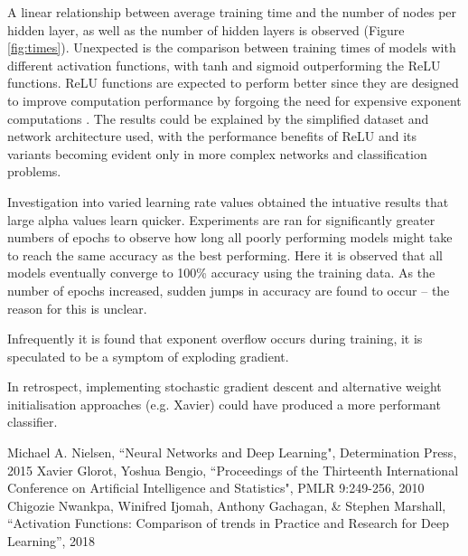\documentclass[12pt]{article}
\begin{document}
A linear relationship between average training time and the number of nodes per hidden layer, as well as the number of hidden layers is observed (Figure \ref{fig:times}). Unexpected is the comparison between training times of models with different activation functions, with tanh and sigmoid outperforming the ReLU functions. ReLU functions are expected to perform better since they are designed to improve computation performance by forgoing the need for expensive exponent computations \cite{Niwa}. The results could be explained by the simplified dataset and network architecture used, with the performance benefits of ReLU and its variants becoming evident only in more complex networks and classification problems.

Investigation into varied learning rate values obtained the intuative results that large alpha values learn quicker. Experiments are ran for significantly
greater numbers of epochs to observe how long all poorly performing models might take to reach the same accuracy as the best performing. Here it is observed that all models eventually converge to 100\% accuracy using the training data. As the number of epochs increased, sudden jumps in accuracy are found to occur -- the reason for this is unclear.

Infrequently it is found that exponent overflow occurs during training,
it is speculated to be a symptom of exploding gradient.

In retrospect, implementing stochastic gradient descent and alternative
weight initialisation approaches (e.g. Xavier) could have produced a
more performant classifier.

\vspace{-1.5em}
\begin{thebibliography}{10}
 Michael A. Nielsen, ``Neural Networks and Deep Learning", Determination Press, 2015
 Xavier Glorot, Yoshua Bengio, ``Proceedings of the Thirteenth International Conference on Artificial Intelligence and Statistics", PMLR 9:249-256, 2010
 Chigozie Nwankpa, Winifred Ijomah, Anthony Gachagan, \& Stephen Marshall, ``Activation Functions: Comparison of trends in Practice and Research for Deep Learning'', 2018

\end{thebibliography}
\end{document}
